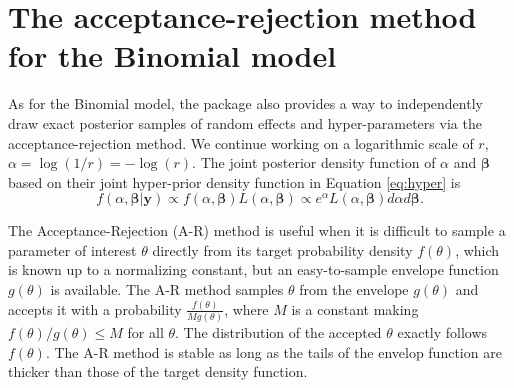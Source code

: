 \documentclass[article]{jss}
\begin{document}


\section[Estimation]{The acceptance-rejection method for the Binomial model}\label{sec_accept}
As for the Binomial model, the package  also provides a way to  independently draw exact posterior samples of random effects and hyper-parameters via the acceptance-rejection method. We continue working on a logarithmic scale of $r$, $\alpha=\log(1/r)=-\log(r)$. The joint posterior density function of $\alpha$ and $\boldsymbol{\beta}$ based on their joint hyper-prior density function in Equation \ref{eq:hyper} is 
\begin{equation}
f(\alpha, \boldsymbol{\beta} \vert \boldsymbol{y})\propto f(\alpha, \boldsymbol{\beta})L(\alpha, \boldsymbol{\beta})\propto e^{\alpha}L(\alpha, \boldsymbol{\beta})d\alpha d\boldsymbol{\beta}.
\end{equation}

The Acceptance-Rejection (A-R) method \citep{everson2000inference, tang2002fitting} is useful when it is difficult to sample a parameter of interest $\theta$ directly from its target probability density $f(\theta)$, which is known up to a normalizing constant, but an easy-to-sample envelope function $g(\theta)$ is available. The A-R method samples $\theta$  from the envelope $g(\theta)$ and accepts it with a probability $\frac{f(\theta)}{Mg(\theta)}$, where $M$ is a constant making $f(\theta)/g(\theta)\le M$ for all $\theta$. The distribution of the accepted $\theta$ exactly follows $f(\theta)$. The A-R method is stable as long as the tails of the envelop function are thicker than those of the target density function. 
\end{document}

